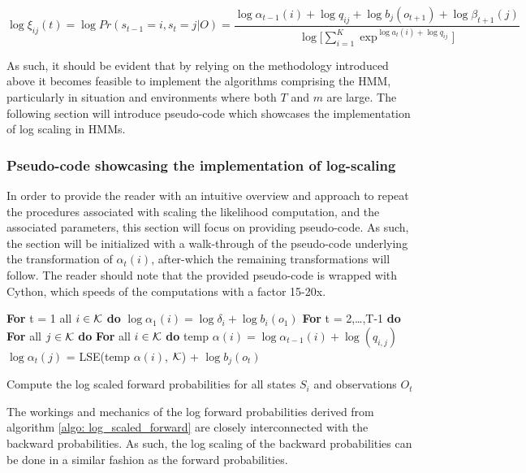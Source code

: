 \begin{equation}
    \log\xi_{ij}(t) = \log Pr(s_{t-1}=i, s_t=j|O) =
    \frac{\log\alpha_{t-1}(i) + \log q_{ij} + \log b_j(o_{t+1}) + \log \beta_{t+1}(j)}{\log\Big[\sum_{i=1}^K \exp^{\log a_t(i)+\log q_{ij}}\Big]}
    \label{eq: log xi}
\end{equation}

As such, it should be evident that by relying on the methodology introduced above it becomes feasible to implement the algorithms comprising the HMM, particularly in situation and environments where both $T$ and $m$ are large. The following section will introduce pseudo-code which showcases the implementation of log scaling in HMMs. 

\subsubsection{Pseudo-code showcasing the implementation of log-scaling}
In order to provide the reader with an intuitive overview and approach to repeat the procedures associated with scaling the likelihood computation, and the associated parameters, this section will focus on providing pseudo-code. As such, the section will be initialized with a walk-through of the pseudo-code underlying the transformation of $\alpha_t(i)$, after-which the remaining transformations will follow. The reader should note that the provided pseudo-code is wrapped with Cython, which speeds of the computations with a factor 15-20x.

\begin{algorithm}[H]
\textbf{For} t = 1 all $i \in \operatorname{\mathcal{K}}$ \textbf{do} \;
\Indp
$\log\alpha_{1}(i) = \log\delta_i + \log b_i(o_1) $ \;
\BlankLine
\Indm
\textbf{For} t = 2,\ldots,T-1 \textbf{do} \;
\Indp 
\textbf{For} all $j \in \operatorname{\mathcal{K}}$ \textbf{do} \;
\Indp
\textbf{For} all $i \in \operatorname{\mathcal{K}}$ \textbf{do} \;
\Indp
temp $\alpha(i) = \log\alpha_{t-1}(i) + \log(q_{i, j})$ \;
\BlankLine
\Indm 
$\log\alpha_{t}(j)$ = LSE(temp $\alpha(i)$, $\operatorname{\mathcal{K}}$) + $\log b_j(o_t)$ \;
\caption{Compute the log scaled forward probabilities for all states $S_i$ and observations $O_t$}
\label{algo: log_scaled_forward}
\end{algorithm}

The workings and mechanics of the log forward probabilities derived from algorithm \ref{algo: log_scaled_forward} are closely interconnected with the backward probabilities. As such, the log scaling of the backward probabilities can be done in a similar fashion as the forward probabilities.   

